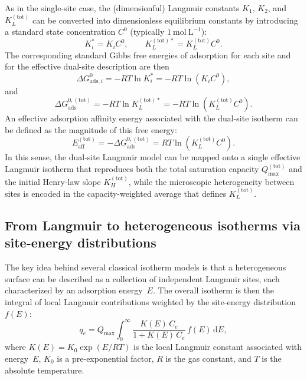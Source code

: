 \documentclass[12pt]{article}
\begin{document}
	As in the single-site case, the (dimensionful) Langmuir constants
	\(K_1\), \(K_2\), and \(K_L^{\mathrm{(tot)}}\) can be converted into
	dimensionless equilibrium constants by introducing a standard state
	concentration \(C^0\) (typically \(1~\mathrm{mol~L^{-1}}\)):
	\begin{equation}
		K_i^{\ast} = K_i C^0,
		\qquad
		K_L^{\mathrm{(tot)}\ast} = K_L^{\mathrm{(tot)}} C^0.
	\end{equation}
	The corresponding standard Gibbs free energies of adsorption for
	each site and for the effective dual-site description are then
	\begin{equation}
		\Delta G_{\mathrm{ads},i}^{0}
		= - R T \ln K_i^{\ast}
		= - R T \ln\left( K_i C^0 \right),
	\end{equation}
	and
	\begin{equation}
		\Delta G_{\mathrm{ads}}^{0,\mathrm{(tot)}}
		= - R T \ln K_L^{\mathrm{(tot)}\ast}
		= - R T \ln\left( K_L^{\mathrm{(tot)}} C^0 \right).
	\end{equation}
	An effective adsorption affinity energy associated with the dual-site
	isotherm can be defined as the magnitude of this free energy:
	\begin{equation}
		E_{\mathrm{aff}}^{\mathrm{(tot)}}
		= - \Delta G_{\mathrm{ads}}^{0,\mathrm{(tot)}}
		= R T \ln\left( K_L^{\mathrm{(tot)}} C^0 \right).
	\end{equation}
	In this sense, the dual-site Langmuir model can be mapped onto a
	single effective Langmuir isotherm that reproduces both the total
	saturation capacity \(Q_{\max}^{\mathrm{(tot)}}\) and the initial
	Henry-law slope \(K_H^{\mathrm{(tot)}}\), while the microscopic
	heterogeneity between sites is encoded in the capacity-weighted
	average that defines \(K_L^{\mathrm{(tot)}}\).
	
	\subsection{From Langmuir to heterogeneous isotherms via site-energy distributions}

	The key idea behind several classical isotherm models is that a
	heterogeneous surface can be described as a collection of independent
	Langmuir sites, each characterized by an adsorption energy~$E$.
	The overall isotherm is then the integral of local Langmuir
	contributions weighted by the site-energy distribution~$f(E)$:
	\begin{equation}
		q_e = Q_{\max} \int_{0}^{\infty}
		\frac{K(E)\, C_e}{1 + K(E)\, C_e}\, f(E)\, \mathrm{d}E,
		\label{eq:general_heterogeneous}
	\end{equation}
	where $K(E) = K_0 \exp(E / RT)$ is the local Langmuir constant
	associated with energy~$E$, $K_0$ is a pre-exponential factor,
	$R$ is the gas constant, and $T$ is the absolute temperature.
\end{document}

